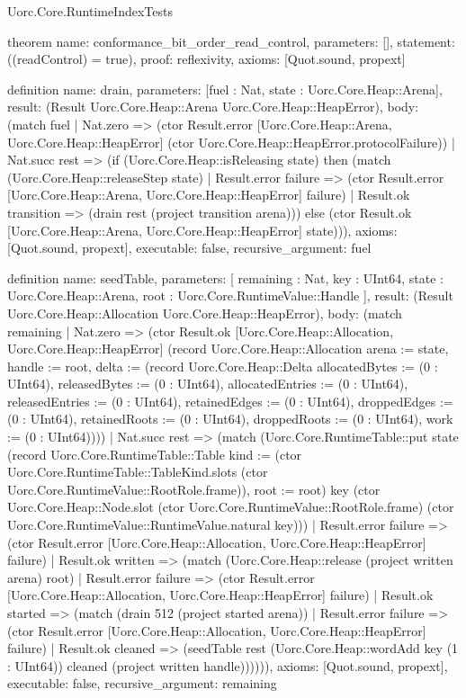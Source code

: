 \begin{lexlean}{Uorc.Core.RuntimeIndexTests}
\begin{semanticmodule}
theorem{
  name: conformance_bit_order_read_control,
  parameters: [],
  statement: ((readControl) = true),
  proof: reflexivity{},
  axioms: [Quot.sound, propext]
}

definition{
  name: drain,
  parameters: [fuel : Nat, state : Uorc.Core.Heap::Arena],
  result: (Result Uorc.Core.Heap::Arena Uorc.Core.Heap::HeapError),
  body: (match fuel
    | Nat.zero => (ctor Result.error [Uorc.Core.Heap::Arena, Uorc.Core.Heap::HeapError] (ctor Uorc.Core.Heap::HeapError.protocolFailure))
    | Nat.succ rest => (if (Uorc.Core.Heap::isReleasing state) then (match (Uorc.Core.Heap::releaseStep state)
      | Result.error failure => (ctor Result.error [Uorc.Core.Heap::Arena, Uorc.Core.Heap::HeapError] failure)
      | Result.ok transition => (drain rest (project transition arena))) else (ctor Result.ok [Uorc.Core.Heap::Arena, Uorc.Core.Heap::HeapError] state))),
  axioms: [Quot.sound, propext],
  executable: false,
  recursive_argument: fuel
}

definition{
  name: seedTable,
  parameters: [
    remaining : Nat,
    key : UInt64,
    state : Uorc.Core.Heap::Arena,
    root : Uorc.Core.RuntimeValue::Handle
  ],
  result: (Result Uorc.Core.Heap::Allocation Uorc.Core.Heap::HeapError),
  body: (match remaining
    | Nat.zero => (ctor Result.ok [Uorc.Core.Heap::Allocation, Uorc.Core.Heap::HeapError] (record Uorc.Core.Heap::Allocation {arena := state, handle := root, delta := (record Uorc.Core.Heap::Delta {allocatedBytes := (0 : UInt64), releasedBytes := (0 : UInt64), allocatedEntries := (0 : UInt64), releasedEntries := (0 : UInt64), retainedEdges := (0 : UInt64), droppedEdges := (0 : UInt64), retainedRoots := (0 : UInt64), droppedRoots := (0 : UInt64), work := (0 : UInt64)})}))
    | Nat.succ rest => (match (Uorc.Core.RuntimeTable::put state (record Uorc.Core.RuntimeTable::Table {kind := (ctor Uorc.Core.RuntimeTable::TableKind.slots (ctor Uorc.Core.RuntimeValue::RootRole.frame)), root := root}) key (ctor Uorc.Core.Heap::Node.slot (ctor Uorc.Core.RuntimeValue::RootRole.frame) (ctor Uorc.Core.RuntimeValue::RuntimeValue.natural key)))
      | Result.error failure => (ctor Result.error [Uorc.Core.Heap::Allocation, Uorc.Core.Heap::HeapError] failure)
      | Result.ok written => (match (Uorc.Core.Heap::release (project written arena) root)
        | Result.error failure => (ctor Result.error [Uorc.Core.Heap::Allocation, Uorc.Core.Heap::HeapError] failure)
        | Result.ok started => (match (drain 512 (project started arena))
          | Result.error failure => (ctor Result.error [Uorc.Core.Heap::Allocation, Uorc.Core.Heap::HeapError] failure)
          | Result.ok cleaned => (seedTable rest (Uorc.Core.Heap::wordAdd key (1 : UInt64)) cleaned (project written handle)))))),
  axioms: [Quot.sound, propext],
  executable: false,
  recursive_argument: remaining
}


\end{semanticmodule}
\end{lexlean}
